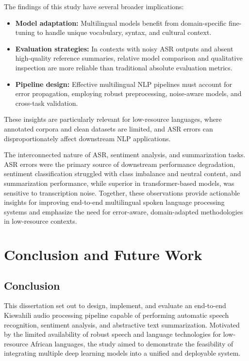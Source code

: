 The findings of this study have several broader implications:

\begin{itemize}
    \item \textbf{Model adaptation:} Multilingual models benefit from domain-specific fine-tuning to handle unique vocabulary, syntax, and cultural context.
    \item \textbf{Evaluation strategies:} In contexts with noisy ASR outputs and absent high-quality reference summaries, relative model comparison and qualitative inspection are more reliable than traditional absolute evaluation metrics.
    \item \textbf{Pipeline design:} Effective multilingual NLP pipelines must account for error propagation, employing robust preprocessing, noise-aware models, and cross-task validation.
\end{itemize}

These insights are particularly relevant for low-resource languages, where annotated corpora and clean datasets are limited, and ASR errors can disproportionately affect downstream NLP applications.

The interconnected nature of ASR, sentiment analysis, and summarization tasks. ASR errors were the primary source of downstream performance degradation, sentiment classification struggled with class imbalance and neutral content, and summarization performance, while superior in transformer-based models, was sensitive to transcription noise. Together, these observations provide actionable insights for improving end-to-end multilingual spoken language processing systems and emphasize the need for error-aware, domain-adapted methodologies in low-resource contexts.

\chapter{Conclusion and Future Work}

\section{Conclusion}

This dissertation set out to design, implement, and evaluate an end-to-end Kiswahili audio processing pipeline capable of performing automatic speech recognition, sentiment analysis, and abstractive text summarization. Motivated by the limited availability of robust speech and language technologies for low-resource African languages, the study aimed to demonstrate the feasibility of integrating multiple deep learning models into a unified and deployable system.

